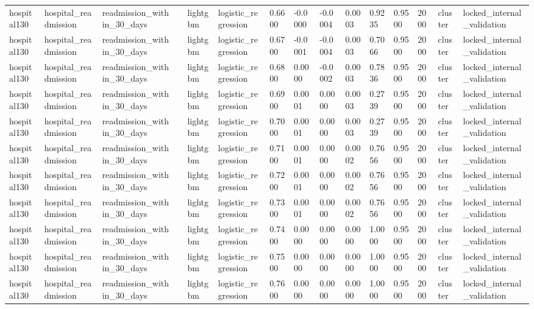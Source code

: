 \begin{tabular}{lllllllllllllll}
hospital130 & hospital\_readmission & readmission\_within\_30\_days &  & lightgbm & logistic\_regression & 0.6600 & -0.0000 & -0.0004 & 0.0003 & 0.9235 & 0.9500 & 2000 & cluster & locked\_internal\_validation \\
hospital130 & hospital\_readmission & readmission\_within\_30\_days &  & lightgbm & logistic\_regression & 0.6700 & -0.0001 & -0.0004 & 0.0003 & 0.7066 & 0.9500 & 2000 & cluster & locked\_internal\_validation \\
hospital130 & hospital\_readmission & readmission\_within\_30\_days &  & lightgbm & logistic\_regression & 0.6800 & 0.0000 & -0.0002 & 0.0003 & 0.7836 & 0.9500 & 2000 & cluster & locked\_internal\_validation \\
hospital130 & hospital\_readmission & readmission\_within\_30\_days &  & lightgbm & logistic\_regression & 0.6900 & 0.0001 & 0.0000 & 0.0003 & 0.2739 & 0.9500 & 2000 & cluster & locked\_internal\_validation \\
hospital130 & hospital\_readmission & readmission\_within\_30\_days &  & lightgbm & logistic\_regression & 0.7000 & 0.0001 & 0.0000 & 0.0003 & 0.2739 & 0.9500 & 2000 & cluster & locked\_internal\_validation \\
hospital130 & hospital\_readmission & readmission\_within\_30\_days &  & lightgbm & logistic\_regression & 0.7100 & 0.0001 & 0.0000 & 0.0002 & 0.7656 & 0.9500 & 2000 & cluster & locked\_internal\_validation \\
hospital130 & hospital\_readmission & readmission\_within\_30\_days &  & lightgbm & logistic\_regression & 0.7200 & 0.0001 & 0.0000 & 0.0002 & 0.7656 & 0.9500 & 2000 & cluster & locked\_internal\_validation \\
hospital130 & hospital\_readmission & readmission\_within\_30\_days &  & lightgbm & logistic\_regression & 0.7300 & 0.0001 & 0.0000 & 0.0002 & 0.7656 & 0.9500 & 2000 & cluster & locked\_internal\_validation \\
hospital130 & hospital\_readmission & readmission\_within\_30\_days &  & lightgbm & logistic\_regression & 0.7400 & 0.0000 & 0.0000 & 0.0000 & 1.0000 & 0.9500 & 2000 & cluster & locked\_internal\_validation \\
hospital130 & hospital\_readmission & readmission\_within\_30\_days &  & lightgbm & logistic\_regression & 0.7500 & 0.0000 & 0.0000 & 0.0000 & 1.0000 & 0.9500 & 2000 & cluster & locked\_internal\_validation \\
hospital130 & hospital\_readmission & readmission\_within\_30\_days &  & lightgbm & logistic\_regression & 0.7600 & 0.0000 & 0.0000 & 0.0000 & 1.0000 & 0.9500 & 2000 & cluster & locked\_internal\_validation \\

\end{tabular}
